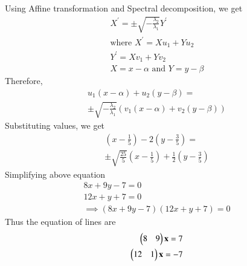 Using Affine transformation and Spectral decomposition, we get
\begin{align}
X^\prime = \pm \sqrt{-\frac{\lambda_2}{\lambda_1}}Y^\prime\\
\text{where } X^\prime = Xu_1 + Yu_2 \\
Y^\prime = Xv_1 + Yv_2\\
X = x-\alpha \text{ and } Y = y - \beta
\end{align}
Therefore, 
\begin{multline}
	u_1(x-\alpha) + u_2(y-\beta) = \\ \pm \sqrt{-\frac{\lambda_2}{\lambda_1}}(v_1(x-\alpha) + v_2(y-\beta))  
\end{multline}
Substituting values, we get 
\begin{multline}
	(x-\frac{1}{5})-2(y-\frac{3}{5}) = \\ \pm \sqrt{\frac{25}{5}}(x-\frac{1}{5})+\frac{1}{2}(y-\frac{3}{5}) 
\end{multline}
Simplifying above equation
\begin{align}
	8x+ 9y - 7 = 0 \\
	12x + y + 7 = 0\\
	\implies (8x+ 9y - 7 )(12x + y + 7) = 0
\end{align}
Thus the equation of lines are
\begin{align}
	\begin{pmatrix}8 & 9\end{pmatrix}\mathbf{x} = 7 \\
	\begin{pmatrix}12 & 1\end{pmatrix}\mathbf{x} = -7 
\end{align}


